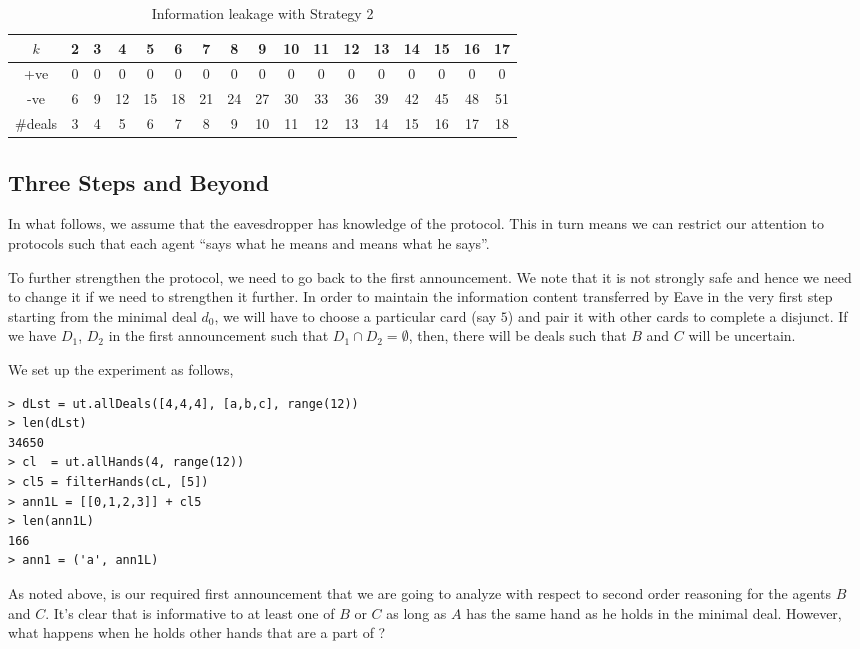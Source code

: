 \begin{table}[ht]
\begin{tabular}{| c || c | c | c | c | c |c | c | c | c | c | c | c | c | c | c | c |}
\hline
    $k$  &   2 &  3  &  4 & 5&  6 & 7 & 8 & 9 & 10 & 11 & 12 & 13 & 14 & 15 & 16 & 17 \\

\hline
  +ve    &   0 &  0 &  0 &  0 &  0 &  0 &  0 &  0 &  0 & 0  &  0 &  0 &  0 &  0 &  0 &  0 \\
  -ve    &   6 &  9 & 12 & 15 & 18 & 21 & 24 & 27 & 30 & 33 & 36 & 39 & 42 & 45 & 48 & 51 \\
  \#deals &  3 &  4 &  5 &  6 &  7 &  8 &  9 & 10 & 11 & 12 & 13 & 14 & 15 & 16 & 17 & 18 \\
\hline
\end{tabular}
\caption{Information leakage with Strategy 2}
\label{leakageStrat2}
\end{table}

\subsection{Three Steps and Beyond}

In what follows, we assume that the eavesdropper
has knowledge of the protocol. This in turn means
we can restrict our attention to protocols such that
each agent ``says what he means and means what he says''.

To further strengthen the protocol, we need
to go back to the first announcement. We note that
it is not strongly safe and hence we need to change it
if we need to strengthen it further. In order to maintain 
the information content transferred by Eave in the very first step
starting from the minimal deal $d_0$, we will have to choose a 
particular card (say $5$) and pair it with other cards to complete
a disjunct. If we have $D_1 $, $D_2$ in the
first announcement such that $D_1 \cap D_2 = \emptyset$, then,
there will be deals such that $B$ and $C$ will be uncertain. 

We set up the experiment as follows,
\begin{verbatim}
> dLst = ut.allDeals([4,4,4], [a,b,c], range(12))
> len(dLst)
34650
> cl  = ut.allHands(4, range(12))
> cl5 = filterHands(cL, [5])
> ann1L = [[0,1,2,3]] + cl5
> len(ann1L)
166
> ann1 = ('a', ann1L)
\end{verbatim}


As noted above,  is our required first announcement
that we are going to analyze with respect to second order reasoning
for the agents $B$ and $C$. It's clear that  is informative
to at least one of $B$ or $C$ as long as $A$ has the same hand as
he holds in the minimal deal. However, what happens when he holds other
hands that are a part of ?

